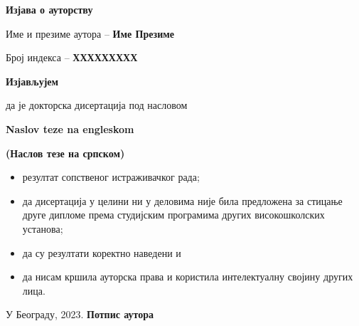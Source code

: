 
\cleardoublepage

\thispagestyle{empty}
\setlength{\parindent}{0pt}

\renewcommand{\headrulewidth}{0pt}


\normalsize

\mbox{}
\vspace{1cm}


\begin{center}
\begin{Large}\textbf{Изјава о ауторству}
\end{Large}\end{center}

\vspace{1.5cm}

Име и презиме аутора -- \textbf{Име Презиме}

Број индекса -- \textbf{ХХХХХХХХХ}

\vspace{.7cm}

\begin{center}
\textbf{Изјављујем}            \end{center}

да је докторска дисертација под насловом 


\textbf{ Naslov teze na engleskom}


\textbf{(Наслов тезе на српском)}

\begin{itemize}
 \item резултат сопственог истраживачког рада;
\item  да дисертација у целини 
ни у деловима није била предложена за стицање друге дипломе према студијским 
програмима других високошколских установа;
\item да су резултати коректно наведени и 
\item да нисам кршила ауторска права и користила интелектуалну својину 
других лица.
\end{itemize}

\vfill
 
У Београду, \hspace{1cm} 2023.  \hfill  \textbf{Потпис
аутора\hspace{2cm}\mbox{}}

\vspace{.5cm}
\hspace{10cm}\hrulefill 

\hspace{\fill}

\let\cleardoublepage\clearpage

